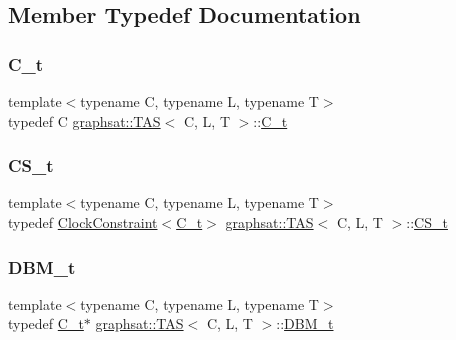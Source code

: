 \subsection{Member Typedef Documentation}
\mbox{\label{classgraphsat_1_1_t_a_s_a05b063b91c0ab2a4f94380de78344d72}} 
\subsubsection{\texorpdfstring{C\_t}{C\_t}}
{\footnotesize\ttfamily template$<$typename C, typename L, typename T$>$ \\
typedef C \mbox{\hyperlink{classgraphsat_1_1_t_a_s}{graphsat\+::\+T\+AS}}$<$ C, L, T $>$\+::\mbox{\hyperlink{classgraphsat_1_1_t_a_s_a05b063b91c0ab2a4f94380de78344d72}{C\+\_\+t}}}

\mbox{\label{classgraphsat_1_1_t_a_s_a88a8d728033de46e942d307ee09fa576}} 
\subsubsection{\texorpdfstring{CS\_t}{CS\_t}}
{\footnotesize\ttfamily template$<$typename C, typename L, typename T$>$ \\
typedef \mbox{\hyperlink{classgraphsat_1_1_clock_constraint}{Clock\+Constraint}}$<$\mbox{\hyperlink{classgraphsat_1_1_t_a_s_a05b063b91c0ab2a4f94380de78344d72}{C\+\_\+t}}$>$ \mbox{\hyperlink{classgraphsat_1_1_t_a_s}{graphsat\+::\+T\+AS}}$<$ C, L, T $>$\+::\mbox{\hyperlink{classgraphsat_1_1_t_a_s_a88a8d728033de46e942d307ee09fa576}{C\+S\+\_\+t}}}

\mbox{\label{classgraphsat_1_1_t_a_s_af66c6ca9cd8c49e5025c7e9abf4e6573}} 
\subsubsection{\texorpdfstring{DBM\_t}{DBM\_t}}
{\footnotesize\ttfamily template$<$typename C, typename L, typename T$>$ \\
typedef \mbox{\hyperlink{classgraphsat_1_1_t_a_s_a05b063b91c0ab2a4f94380de78344d72}{C\+\_\+t}}$\ast$ \mbox{\hyperlink{classgraphsat_1_1_t_a_s}{graphsat\+::\+T\+AS}}$<$ C, L, T $>$\+::\mbox{\hyperlink{classgraphsat_1_1_t_a_s_af66c6ca9cd8c49e5025c7e9abf4e6573}{D\+B\+M\+\_\+t}}}

